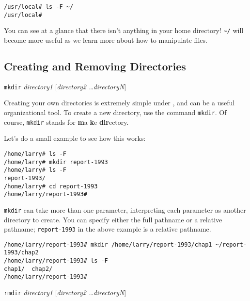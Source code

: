 \begin{screen}\begin{verbatim}
/usr/local# ls -F ~/
/usr/local# 
\end{verbatim}\end{screen}

You can see at a glance that there isn't anything in your home
directory!  {\tt \verb+~+/} will become more useful as we learn more
about how to manipulate files.

\subsection{Creating and Removing Directories}


\begin{command}
{\tt mkdir} {\sl directory1} [{\sl directory2 \ldots directoryN}]
\end{command}

Creating your own directories is extremely simple under \unix, and can
be a useful organizational tool. To create a new directory, use the
command {\tt mkdir}.  Of course, {\tt mkdir} stands for {\bf m}a{\bf
  k}e {\bf dir}ectory.

Let's do a small example to see how this works:
\begin{screen}\begin{verbatim}
/home/larry# ls -F
/home/larry# mkdir report-1993
/home/larry# ls -F
report-1993/
/home/larry# cd report-1993
/home/larry/report-1993#
\end{verbatim}
\end{screen}

{\tt mkdir} can take more than one parameter, interpreting each
parameter as another directory to create.  You can specify either the
full pathname or a relative pathname; {\tt report-1993} in the above
example is a relative pathname.

\begin{screen}\begin{verbatim}
/home/larry/report-1993# mkdir /home/larry/report-1993/chap1 ~/report-1993/chap2
/home/larry/report-1993# ls -F
chap1/  chap2/
/home/larry/report-1993#
\end{verbatim}\end{screen}

\begin{command}
  {\tt rmdir} {\sl directory1} [{\sl directory2 \ldots directoryN}]
\end{command}

